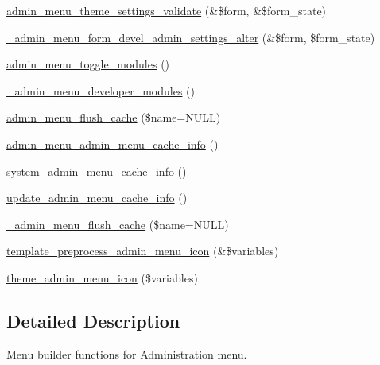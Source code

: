 \begin{DoxyCompactItemize}
\item 
\hyperlink{admin__menu_8inc_a773e8076793591c82ba893436f46153c}{admin\_\-menu\_\-theme\_\-settings\_\-validate} (\&\$form, \&\$form\_\-state)
\item 
\hyperlink{admin__menu_8inc_aa78509bb044821faf77cf6624bd726f8}{\_\-admin\_\-menu\_\-form\_\-devel\_\-admin\_\-settings\_\-alter} (\&\$form, \$form\_\-state)
\item 
\hyperlink{admin__menu_8inc_ab2b3513df09bbd7a3deae15086d4898e}{admin\_\-menu\_\-toggle\_\-modules} ()
\item 
\hyperlink{admin__menu_8inc_adc75f56f673a11494a4ed92d15e04cdf}{\_\-admin\_\-menu\_\-developer\_\-modules} ()
\item 
\hyperlink{admin__menu_8inc_a954c039363bc1ce4c1fa1260f4f107e2}{admin\_\-menu\_\-flush\_\-cache} (\$name=NULL)
\item 
\hyperlink{admin__menu_8inc_a9a83be386880f46f5f31e08be2529b51}{admin\_\-menu\_\-admin\_\-menu\_\-cache\_\-info} ()
\item 
\hyperlink{admin__menu_8inc_addfcc1ff94f62409d4ff7fa7f523aa45}{system\_\-admin\_\-menu\_\-cache\_\-info} ()
\item 
\hyperlink{admin__menu_8inc_a244f8c73c3414cbf1d9ec52f2fd65fbc}{update\_\-admin\_\-menu\_\-cache\_\-info} ()
\item 
\hyperlink{admin__menu_8inc_a34a792a4ac923bf39cf8e8f87fb92124}{\_\-admin\_\-menu\_\-flush\_\-cache} (\$name=NULL)
\item 
\hyperlink{admin__menu_8inc_af696ca093076e195d86786d7516ee9df}{template\_\-preprocess\_\-admin\_\-menu\_\-icon} (\&\$variables)
\item 
\hyperlink{admin__menu_8inc_ab93751624cbfa203208fba5c90192ee1}{theme\_\-admin\_\-menu\_\-icon} (\$variables)
\end{DoxyCompactItemize}


\subsection{Detailed Description}
Menu builder functions for Administration menu. 

